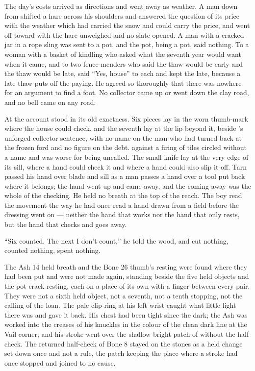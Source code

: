 The day's costs arrived as directions and went away as weather. A man down from  shifted a hare across his shoulders and answered the question of its price with the weather which had carried the snow and could carry the price, and went off toward  with the hare unweighed and no slate opened. A man with a cracked jar in a rope sling was sent to a pot, and the pot, being a pot, said nothing. To a woman with a basket of kindling who asked what the seventh year would want when it came, and to two fence-menders who said the thaw would be early and the thaw would be late,  said “Yes, house” to each and kept the late, because a late thaw puts off the paying. He agreed so thoroughly that there was nowhere for an argument to find a foot. No collector came up or went down the clay road, and no bell came on any road.

\scenebreak

At  the account stood in its old exactness. Six pieces lay in the worn thumb-mark where the house could check, and the seventh lay at the lip beyond it, beside 's unforged collector sentence, with no name on the man who had turned back at the frozen ford and no figure on the debt.  against a firing of tiles circled without a name and was worse for being uncalled. The small knife lay at the very edge of its sill, where a hand could check it and where a hand could also slip it off. Tarn passed his hand over blade and sill as a man passes a hand over a tool put back where it belongs; the hand went up and came away, and the coming away was the whole of the checking. He held no breath at the top of the reach. The boy read the movement the way he had once read a hand drawn from a field before the dressing went on --- neither the hand that works nor the hand that only rests, but the hand that checks and goes away.

“Six counted. The next I don't count,” he told the wood, and cut nothing, counted nothing, spent nothing.

The Ash 14 held breath and the Bone 26 thumb's resting were found where they had been put and were not made again, standing beside the five held objects and the pot-crack resting, each on a place of its own with a finger between every pair. They were not a sixth held object, not a seventh, not a tenth stopping, not the calling of the loan. The pale clip-ring at his left wrist caught what little light there was and gave it back. His chest had been tight since the dark; the Ash was worked into the creases of his knuckles in the colour of the clean dark line at the Vail corner; and his stroke went over the shallow bright patch of  without the half-check. The returned half-check of Bone 8 stayed on the stones as a held change set down once and not a rule, the patch keeping the place where a stroke had once stopped and joined to no cause.

